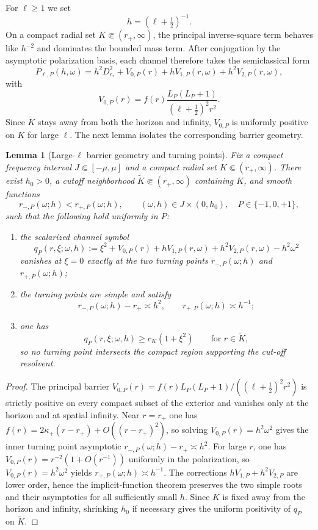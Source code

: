 \documentclass[12pt]{article}
\numberwithin{equation}{section}
\theoremstyle{plain}
\newtheorem{lemma}[theorem]{Lemma}
\theoremstyle{definition}
\theoremstyle{remark}
\newcommand{\om}{\omega}
\begin{document}
For $\ell\ge1$ we set
\[
   h=(\ell+\tfrac12)^{-1}.
\]
On a compact radial set $K\Subset(r_+,\infty)$, the principal inverse-square term behaves like $h^{-2}$ and dominates the bounded mass term.  After conjugation by the asymptotic polarization basis, each channel therefore takes the semiclassical form
\[
   P_{\ell,P}(h,\om)
   =
   h^2D_{r_*}^2
   +V_{0,P}(r)
   +hV_{1,P}(r,\om)
   +h^2V_{2,P}(r,\om),
\]
with
\[
   V_{0,P}(r)=f(r)\frac{L_P(L_P+1)}{(\ell+\tfrac12)^2r^2}.
\]
Since $K$ stays away from both the horizon and infinity, $V_{0,P}$ is uniformly positive on $K$ for large $\ell$.  The next lemma isolates the corresponding barrier geometry.

\begin{lemma}[Large-$\ell$ barrier geometry and turning points]\label{lem:largeell_barrier}
Fix a compact frequency interval $J\Subset[-\mu,\mu]$ and a compact radial set $K\Subset(r_+,\infty)$.  There exist $h_0>0$, a cutoff neighborhood $\widetilde K\Subset(r_+,\infty)$ containing $K$, and smooth functions
\[
   r_{-,P}(\om;h)<r_{+,P}(\om;h),
   \qquad
   (\om,h)\in J\times(0,h_0),
   \quad P\in\{-1,0,+1\},
\]
such that the following hold uniformly in $P$:
\begin{enumerate}[label=\textnormal{(\roman*)}]
   \item the scalarized channel symbol
   \[
      q_{P}(r,\xi;\om,h)
      :=
      \xi^2+V_{0,P}(r)+hV_{1,P}(r,\om)+h^2V_{2,P}(r,\om)-h^2\om^2
   \]
   vanishes at $\xi=0$ exactly at the two turning points $r_{-,P}(\om;h)$ and $r_{+,P}(\om;h)$;
   \item the turning points are simple and satisfy
   \[
      r_{-,P}(\om;h)-r_+\asymp h^2,
      \qquad
      r_{+,P}(\om;h)\asymp h^{-1};
   \]
   \item one has
   \[
      q_P(r,\xi;\om,h)\ge c_K(1+\xi^2)
      \qquad\text{for }r\in\widetilde K,
   \]
   so no turning point intersects the compact region supporting the cut-off resolvent.
\end{enumerate}
\end{lemma}

\begin{proof}
The principal barrier $V_{0,P}(r)=f(r)L_P(L_P+1)/((\ell+\tfrac12)^2r^2)$ is strictly positive on every compact subset of the exterior and vanishes only at the horizon and at spatial infinity.  Near $r=r_+$ one has $f(r)=2\kappa_+(r-r_+)+O((r-r_+)^2)$, so solving $V_{0,P}(r)=h^2\om^2$ gives the inner turning point asymptotic $r_{-,P}(\om;h)-r_+\asymp h^2$.  For large $r$, one has $V_{0,P}(r)=r^{-2}(1+O(r^{-1}))$ uniformly in the polarization, so $V_{0,P}(r)=h^2\om^2$ yields $r_{+,P}(\om;h)\asymp h^{-1}$.  The corrections $hV_{1,P}+h^2V_{2,P}$ are lower order, hence the implicit-function theorem preserves the two simple roots and their asymptotics for all sufficiently small $h$.  Since $K$ is fixed away from the horizon and infinity, shrinking $h_0$ if necessary gives the uniform positivity of $q_P$ on $\widetilde K$.
\end{proof}
\end{document}
